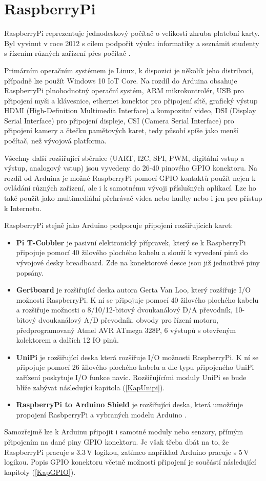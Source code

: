 \section{RaspberryPi}
\label{KapRaspi}

RaspberryPi reprezentuje jednodeskový počítač o velikosti zhruba platební karty. Byl vyvinut v roce 2012 s cílem podpořit výuku informatiky a seznámit studenty s řízením různých zařízení přes počítač \cite{Raspi}. 

Primárním operačním systémem je Linux, k dispozici je několik jeho distribucí, případně lze použít Windows 10 IoT Core. Na rozdíl do Arduina obsahuje RaspberryPi plnohodnotný operační systém, ARM mikrokontrolér, USB pro připojení myši a klávesnice, ethernet konektor pro připojení sítě, grafický výstup HDMI (High-Definition Multimedia Interface) a kompozitní video, DSI (Display Serial Interface) pro připojení displeje, CSI (Camera Serial Interface) pro připojení kamery a čtečku pamětových karet, tedy působí spíše jako menší počítač, než vývojová platforma. 

Všechny další rozšiřující sběrnice (UART, I2C, SPI, PWM, digitální vstup a výstup, analogový vstup) jsou vyvedeny do 26-40 pinového GPIO konektoru. Na rozdíl od Arduina je možné RaspberryPi pomocí GPIO kontaktů použít nejen k ovládání různých zařízení, ale i k samotnému vývoji příslušných aplikací. Lze ho také použít jako multimediální přehrávač videa nebo hudby nebo i jen pro přístup k Internetu.

RaspberryPi stejně jako Arduino podporuje připojení rozšiřujících karet:

\begin{itemize}
	\item \textbf{Pi T-Cobbler} je pasivní elektronický přípravek, který se k RaspberryPi připojuje pomocí 40 žilového plochého kabelu a slouží k vyvedení pinů do vývojové desky breadboard. Zde na konektorové desce jsou již jednotlivé piny popsány.
\item \textbf{Gertboard} je rozšiřující deska autora Gerta Van Loo, který rozšiřuje I/O možnosti RaspberryPi. K ní se připojuje pomocí 40 žilového plochého kabelu a rozšiřuje možnosti o 8/10/12-bitový dvoukanálový D/A převodník, 10-bitový dvoukanálový A/D převodník, obvody pro řízení motoru, předprogramovaný Atmel AVR ATmega 328P, 6 výstupů s otevřeným kolektorem a dalších 12 IO pinů. 
\item \textbf{UniPi} je rozšiřující deska která rozšiřuje I/O možnosti RaspberryPi. K ní se připojuje pomocí 26 žilového plochého kabelu a dle typu připojeného UniPi zařízení poskytuje I/O funkce navíc. Rozšiřujícími moduly UniPi se bude blíže zabývat následující kapitola (\ref{KapUnipi}).
\item \textbf{RaspberryPi to Arduino Shield} je rozšiřující deska, která umožňuje propojení RasbperryPi a vybraných modelu Arduino \cite{GertBoard,UniPiBoard}.
\end{itemize}
Samozřejmě lze k Arduinu připojit i samotné moduly nebo senzory, přímým připojením na dané piny GPIO konektoru. Je však třeba dbát na to, že RaspberryPi pracuje s 3.3\,V logikou, zatímco například Arduino pracuje s 5\,V logikou. Popis GPIO konektoru včetně možností připojení je součástí následující kapitoly (\ref{KapGPIO}).

